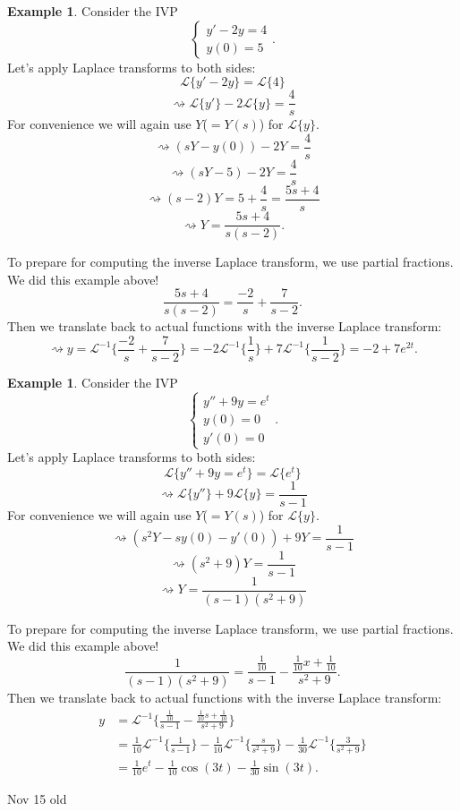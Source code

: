 \documentclass[12pt]{amsart}
\numberwithin{equation}{section}
\theoremstyle{plain} %
\newcommand{\Nov}[1]{Nov #1 old}
\newcommand{\rsa}{\rightsquigarrow}
\theoremstyle{definition}
\newtheorem{ex}[equation]{Example}
\theoremstyle{remark}
\newcommand{\LA}[1]{\mathcal{L}\{ #1 \}}
\newcommand{\LAi}[1]{\mathcal{L}^{-1}\{ #1 \}}
\begin{document}
\begin{ex}
Consider the IVP
\[ \begin{cases} y' - 2y = 4 \\ y(0) = 5\end{cases}.\]
Let's apply Laplace transforms to both sides:
\[ \LA{ y' - 2y} = \LA{4}\]
\[\rsa \LA{y'} - 2 \LA{y} = \frac{4}{s}\]
For convenience we will again use $Y$($=Y(s)$) for $\LA{y}$.
\[ \rsa (sY - y(0)) - 2 Y =\frac{4}{s}\]
\[ \rsa (sY - 5) - 2 Y =\frac{4}{s}\]
\[ \rsa (s-2)Y = 5+\frac{4}{s} = \frac{5s+4}{s}\]
\[ \rsa Y = \frac{5s+4}{s(s-2)}.\]

To prepare for computing the inverse Laplace transform, we use partial fractions. We did this example above!
\[ \frac{5s+4}{s(s-2)} = \frac{-2}{s} + \frac{7}{s-2}.\]
Then we translate back to actual functions with the inverse Laplace transform:
\[ \rsa y = \LAi{\frac{-2}{s} + \frac{7}{s-2}} = -2 \LAi{\frac{1}{s}} + 7 \LAi{\frac{1}{s-2}} = -2 + 7e^{2t}.\]
\end{ex}

\begin{ex}
Consider the IVP
\[ \begin{cases} y'' +9y = e^t \\ y(0) = 0 \\ y'(0)=0\end{cases}.\]
Let's apply Laplace transforms to both sides:
\[ \LA{  y'' +9y = e^t} = \LA{e^t}\]
\[\rsa \LA{y''} + 9 \LA{y} = \frac{1}{s-1}\]
For convenience we will again use $Y$($=Y(s)$) for $\LA{y}$.
\[ \rsa (s^2Y - sy(0)-y'(0)) +9 Y =\frac{1}{s-1}\]
\[ \rsa (s^2+9)Y=\frac{1}{s-1}\]
\[ \rsa Y =\frac{1}{(s-1)(s^2+9)}\]

To prepare for computing the inverse Laplace transform, we use partial fractions. We did this example above!
\[ \frac{1}{(s-1)(s^2+9)} = \frac{\frac{1}{10}}{s-1} - \frac{\frac{1}{10}x+\frac{1}{10}}{s^2+9}. \]
Then we translate back to actual functions with the inverse Laplace transform:
\begin{align*} y &= \LAi{\frac{\frac{1}{10}}{s-1} - \frac{\frac{1}{10}s+\frac{1}{10}}{s^2+9}} \\&=\frac{1}{10} \LAi{\frac{1}{s-1}} - \frac{1}{10} \LAi{\frac{s}{s^2+9}}  - \frac{1}{30} \LAi{\frac{3}{s^2+9}} \\&= \frac{1}{10} e^t- \frac{1}{10} \cos(3t)-\frac{1}{30} \sin(3t).
\end{align*}
\end{ex}



\Nov{15}
\end{document}

